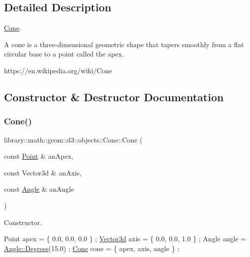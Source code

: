 \subsection{Detailed Description}
\hyperlink{classlibrary_1_1math_1_1geom_1_1d3_1_1objects_1_1_cone}{Cone}. 

A cone is a three-\/dimensional geometric shape that tapers smoothly from a flat circular base to a point called the apex.

https\+://en.wikipedia.\+org/wiki/\+Cone 

\subsection{Constructor \& Destructor Documentation}
\mbox{\label{classlibrary_1_1math_1_1geom_1_1d3_1_1objects_1_1_cone_a06829024b976d32cccc97fa2ee774670}} 
\subsubsection{\texorpdfstring{Cone()}{Cone()}}
{\footnotesize\ttfamily library\+::math\+::geom\+::d3\+::objects\+::\+Cone\+::\+Cone (\begin{DoxyParamCaption}\item[{const \hyperlink{classlibrary_1_1math_1_1geom_1_1d3_1_1objects_1_1_point}{Point} \&}]{an\+Apex,  }\item[{const Vector3d \&}]{an\+Axis,  }\item[{const \hyperlink{classlibrary_1_1math_1_1geom_1_1_angle}{Angle} \&}]{an\+Angle }\end{DoxyParamCaption})}



Constructor. 


\begin{DoxyCode}
Point apex = \{ 0.0, 0.0, 0.0 \} ;
\hyperlink{namespacelibrary_1_1math_1_1obj_a977e84e9bf317a4e7dd9d6d671d6da2f}{Vector3d} axis = \{ 0.0, 0.0, 1.0 \} ;
Angle angle = \hyperlink{classlibrary_1_1math_1_1geom_1_1_angle_a64aa53e8420aeb6f671d86c65c370bc8}{Angle::Degrees}(15.0) ;
\hyperlink{classlibrary_1_1math_1_1geom_1_1d3_1_1objects_1_1_cone_a06829024b976d32cccc97fa2ee774670}{Cone} cone = \{ apex, axis, angle \} ;
\end{DoxyCode}



